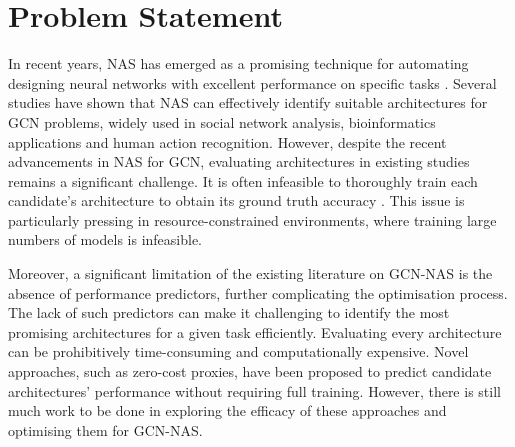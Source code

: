 \section{Problem Statement}\label{ProblemStatement}
In recent years, \gls{NAS} has emerged as a promising technique for automating designing neural networks with excellent performance on specific tasks \autocite{zoph2016neural}. Several studies have shown that \gls{NAS} can effectively identify suitable architectures for \gls{GCN} problems, widely used in social network analysis, bioinformatics applications and human action recognition. However, despite the recent advancements in \gls{NAS} for \gls{GCN}, evaluating architectures in existing studies remains a significant challenge. It is often infeasible to thoroughly train each candidate's architecture to obtain its ground truth accuracy \autocite{zoph2016neural}. This issue is particularly pressing in resource-constrained environments, where training large numbers of models is infeasible.

Moreover, a significant limitation of the existing literature on \gls{GCN}-\gls{NAS} is the absence of performance predictors, further complicating the optimisation process. The lack of such predictors can make it challenging to identify the most promising architectures for a given task efficiently. Evaluating every architecture can be prohibitively time-consuming and computationally expensive. Novel approaches, such as zero-cost proxies, have been proposed to predict candidate architectures' performance without requiring full training. However, there is still much work to be done in exploring the efficacy of these approaches and optimising them for \gls{GCN}-\gls{NAS}.
